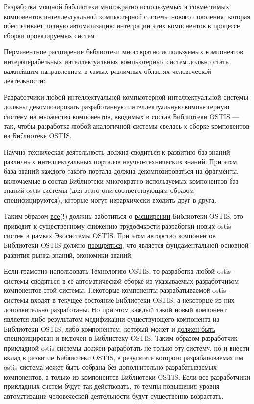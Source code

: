 \begin{textitemize}
	\item Разработка мощной библиотеки многократно используемых и совместимых компонентов интеллектуальной компьютерной системы нового поколения, которая обеспечивает \uline{полную} автоматизацию интеграции этих компонентов в процессе сборки проектируемых систем
	\item Перманентное расширение библиотеки многократно используемых компонентов интероперабельных интеллектуальных компьютерных систем должно стать важнейшим направлением в самых различных областях человеческой деятельности:
	\begin{textitemize}
		\item Разработчики любой интеллектуальной компьютерной интеллектуальной системы должны \uline{декомпозировать} разработанную интеллектуальную компьютерную систему на множество компонентов, вводимых в состав Библиотеки OSTIS --- так, чтобы разработка любой аналогичной системы свелась к сборке компонентов из Библиотеки OSTIS.
		\item Научно-техническая деятельность должна сводиться к развитию баз знаний различных интеллектуальных порталов научно-технических знаний. При этом база знаний каждого такого портала должна декомпозироваться на фрагменты, включаемые в состав Библиотеки многократно используемых компонентов баз знаний ostis-системы (для этого они соответствующим образом специфицируются), которые могут иерархически входить друг в друга.
		\item Таким образом \uline{все}(!) должны заботиться о \uline{расширении} Библиотеки OSTIS, это приводит к существенному снижению трудоёмкости разработки новых ostis-систем в рамках Экосистемы OSTIS. При этом авторство компонентов Библиотеки OSTIS должно \uline{поощряться}, что является фундаментальной основной развития рынка знаний, экономики знаний.  
	\end{textitemize}
\end{textitemize}

Если грамотно использовать Технологию OSTIS, то разработка любой ostis-системы сводиться в её автоматической сборке из указываемых разработчиком компонентов этой системы. Некоторые компоненты разрабатываемой ostis-системы входят в текущее состояние Библиотеки OSTIS, а некоторые из них дополнительно разработаны. Но при этом каждый такой новый компонент является либо результатом модификации существующего компонента из Библиотеки OSTIS, либо компонентом, который может и \uline{должен быть} специфицирован и включен в Библиотеку OSTIS. Таким образом разработчик прикладной ostis-системы должен разработать не только эту систему, но и внести вклад в развитие Библиотеки OSTIS, в результате которого разрабатываемая им ostis-система может быть собрана без дополнительно разрабатываемых компонентов, а только из компонентов Библиотеки OSTIS. Если все разработчики прикладных систем будут так действовать, то темпы повышения уровня автоматизации человеческой деятельности будут существенно возрастать.


